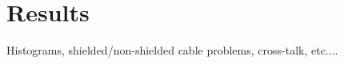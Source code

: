 \section{Results}
\label{sec:Results}

Histograms, shielded/non-shielded cable problems, cross-talk, etc....

